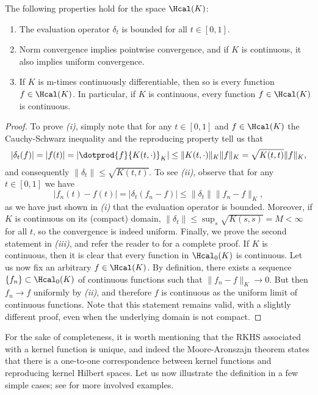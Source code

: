 \begin{proposition} The following properties hold for the space \(\Hcal(K)\):
  \begin{enumerate}
    \item The evaluation operator \(\delta_t\) is bounded for all \(t\in[0,1]\).
    \item Norm convergence implies pointwise convergence, and if \(K\) is continuous, it also implies uniform convergence.
    \item If \(K\) is m-times continuously differentiable, then so is every function \(f\in\Hcal(K)\). In particular, if \(K\) is continuous, every function \(f\in\Hcal(K)\) is continuous.
  \end{enumerate}
\end{proposition}
\begin{proof}
  To prove \textit{(i)}, simply note that for any \(t\in[0,1]\) and \(f\in\Hcal(K)\) the Cauchy-Schwarz inequality and the reproducing property tell us that
  \[
  |\delta_t(f)| = |f(t)| = |\dotprod{f}{K(t, \cdot)}_K| \leq \|K(t, \cdot)\|_K \|f\|_K = \sqrt{K(t, t)}\|f\|_K,
  \]
  and consequently \(\|\delta_t\|\leq \sqrt{K(t, t)}\). To see \textit{(ii)}, observe that for any \(t\in[0,1]\) we have
  \[
    |f_n(t) - f(t)| = |\delta_t(f_n - f)| \leq \|\delta_t\|\|f_n - f\|_K,
  \]
  as we have just shown in \textit{(i)} that the evaluation operator is bounded. Moreover, if \(K\) is continuous on its (compact) domain, \(\|\delta_t\| \leq \sup_s \sqrt{K(s, s)}=M<\infty\) for all \(t\), so the convergence is indeed uniform. Finally, we prove the second statement in \textit{(iii)}, and refer the reader to \citet[][Th 2.6]{saitoh2016theory} for a complete proof. If \(K\) is continuous, then it is clear that every function in \(\Hcal_0(K)\) is continuous. Let us now fix an arbitrary \(f\in \Hcal(K)\). By definition, there exists a sequence \(\{f_n\}\subset \Hcal_0(K)\) of continuous functions such that \(\|f_n - f\|_K \to 0\). But then \(f_n \to f\) uniformly by \textit{(ii)}, and therefore \(f\) is continuous as the uniform limit of continuous functions. Note that this statement remains valid, with a slightly different proof, even when the underlying domain is not compact.
\end{proof}

For the sake of completeness, it is worth mentioning that the RKHS associated with a kernel function is unique, and indeed the Moore-Aronszajn theorem \citep[e.g.][Th. 3]{berlinet2004reproducing} states that there is a one-to-one correspondence between kernel functions and reproducing kernel Hilbert spaces. Let us now illustrate the definition in a few simple cases; see \citet[][Ch.~1]{saitoh2016theory} for more involved examples.

